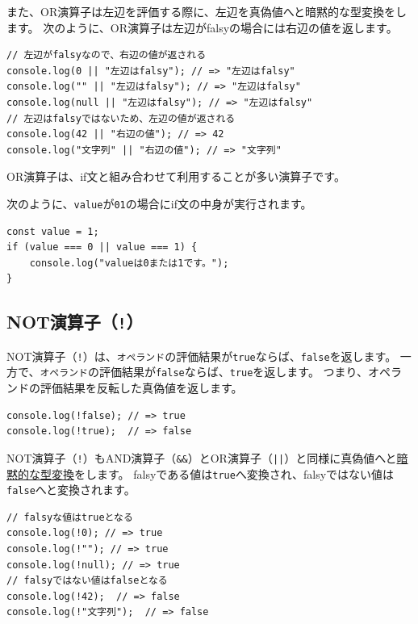 また、OR演算子は左辺を評価する際に、左辺を真偽値へと暗黙的な型変換をします。
次のように、OR演算子は左辺がfalsyの場合には右辺の値を返します。

\begin{lstlisting}
// 左辺がfalsyなので、右辺の値が返される
console.log(0 || "左辺はfalsy"); // => "左辺はfalsy"
console.log("" || "左辺はfalsy"); // => "左辺はfalsy"
console.log(null || "左辺はfalsy"); // => "左辺はfalsy"
// 左辺はfalsyではないため、左辺の値が返される
console.log(42 || "右辺の値"); // => 42
console.log("文字列" || "右辺の値"); // => "文字列"
\end{lstlisting}

OR演算子は、if文と組み合わせて利用することが多い演算子です。

次のように、\texttt{value}が\texttt{0}\textbf{}\texttt{1}の場合にif文の中身が実行されます。

\begin{lstlisting}
const value = 1;
if (value === 0 || value === 1) {
    console.log("valueは0または1です。");
}
\end{lstlisting}

\hypertarget{not-operator}{%
\subsection{NOT演算子（\texttt{!}）}\label{not-operator}}

NOT演算子（\texttt{!}）は、\texttt{オペランド}の評価結果が\texttt{true}ならば、\texttt{false}を返します。
一方で、\texttt{オペランド}の評価結果が\texttt{false}ならば、\texttt{true}を返します。
つまり、オペランドの評価結果を反転した真偽値を返します。

\begin{lstlisting}
console.log(!false); // => true
console.log(!true);  // => false
\end{lstlisting}

NOT演算子（\texttt{!}）もAND演算子（\texttt{\&\&}）とOR演算子（\texttt{||}）と同様に真偽値へと\hyperlink{implicit-coercion}{暗黙的な型変換}をします。
falsyである値は\texttt{true}へ変換され、falsyではない値は\texttt{false}へと変換されます。

\begin{lstlisting}
// falsyな値はtrueとなる
console.log(!0); // => true
console.log(!""); // => true
console.log(!null); // => true
// falsyではない値はfalseとなる
console.log(!42);  // => false
console.log(!"文字列");  // => false
\end{lstlisting}

